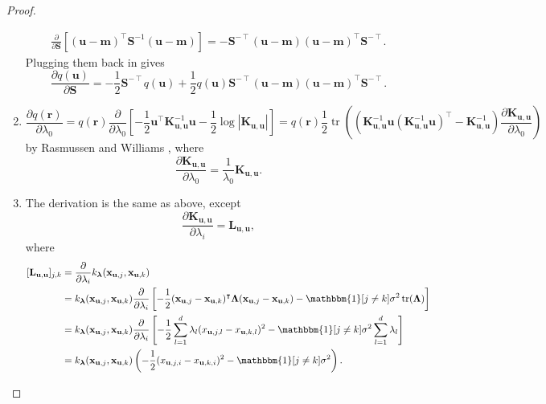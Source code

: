\documentclass{article}
\theoremstyle{definition}
\DeclareMathOperator{\tr}{tr}
\newcommand{\Kuu}{\mathbf{K}_{\mathbf{u},\mathbf{u}}}
\newcommand{\Luu}{\mathbf{L}_{\mathbf{u},\mathbf{u}}}
\newcommand{\dS}{\frac{\partial}{\partial\mathbf{S}}}
\newcommand{\dlz}{\frac{\partial}{\partial \lambda_0}}
\newcommand{\dl}{\frac{\partial}{\partial \lambda_i}}
\begin{document}
\begin{proof}
\begin{enumerate}
\begin{gather*}
      \dS[(\mathbf{u} - \mathbf{m})^\intercal\mathbf{S}^{-1}(\mathbf{u} -
      \mathbf{m})] = -\mathbf{S}^{-\intercal}(\mathbf{u} - \mathbf{m})(\mathbf{u} -
                     \mathbf{m})^\intercal\mathbf{S}^{-\intercal}.
    \end{gather*}
    Plugging them back in gives
    \[
      \frac{\partial q(\mathbf{u})}{\partial \mathbf{S}} =
      -\frac{1}{2}\mathbf{S}^{-\intercal}q(\mathbf{u}) +
      \frac{1}{2}q(\mathbf{u})\mathbf{S}^{-\intercal}(\mathbf{u} -
      \mathbf{m})(\mathbf{u} - \mathbf{m})^\intercal\mathbf{S}^{-\intercal}.
    \]
  \item
    \[
      \frac{\partial q(\mathbf{r})}{\partial \lambda_0} = q(\mathbf{r}) \dlz
      \left[-\frac{1}{2}\mathbf{u}^\intercal\Kuu^{-1}\mathbf{u} -
        \frac{1}{2}\log|\Kuu| \right] = q(\mathbf{r})\frac{1}{2}\tr
      \left((\Kuu^{-1}\mathbf{u}(\Kuu^{-1}\mathbf{u})^\intercal - \Kuu^{-1})
        \frac{\partial \Kuu}{\partial \lambda_0} \right)
    \]
    by Rasmussen and Williams \cite{DBLP:books/lib/RasmussenW06}, where
    \[
      \frac{\partial \Kuu}{\partial \lambda_0} = \frac{1}{\lambda_0}\Kuu.
    \]
  \item The derivation is the same as above, except
    \[
      \frac{\partial \Kuu}{\partial \lambda_i} = \Luu,
    \]
    where
    \[
      \begin{split}
        [\Luu]_{j,k} &= \dl k_{\bm\lambda}(\mathbf{x}_{\mathbf{u},j},
        \mathbf{x}_{\mathbf{u},k}) \\
        &= k_{\bm\lambda}(\mathbf{x}_{\mathbf{u},j}, \mathbf{x}_{\mathbf{u},k})
        \dl \left[-\frac{1}{2}(\mathbf{x}_{\mathbf{u},j} -
          \mathbf{x}_{\mathbf{u},k})^\intercal \bm\Lambda
          (\mathbf{x}_{\mathbf{u},j} - \mathbf{x}_{\mathbf{u},k}) -
          \mathbbm{1}[j \ne k]\sigma^2\tr(\bm\Lambda) \right] \\
        &= k_{\bm\lambda}(\mathbf{x}_{\mathbf{u},j}, \mathbf{x}_{\mathbf{u},k})
        \dl \left[-\frac{1}{2}\sum_{l=1}^d \lambda_l
          (x_{\mathbf{u},j,l} - x_{\mathbf{u},k,l})^2 -
          \mathbbm{1}[j \ne k]\sigma^2\sum_{l=1}^d \lambda_l \right] \\
        &= k_{\bm\lambda}(\mathbf{x}_{\mathbf{u},j}, \mathbf{x}_{\mathbf{u},k})
        \left( -\frac{1}{2}(x_{\mathbf{u},j,i} -
        x_{\mathbf{u},k,i})^2 - \mathbbm{1}[j \ne k]\sigma^2 \right).
      \end{split}
    \]
  \end{enumerate}
\end{proof}
\end{document}
